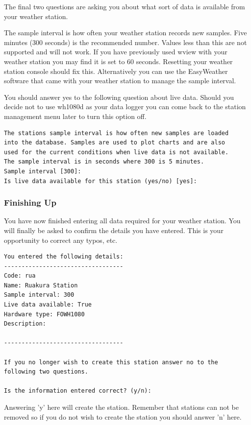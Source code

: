 \documentclass[a4paper,10pt,draft]{book}
\begin{document}
The final two questions are asking you about what sort of data is available from your weather station.

The sample interval is how often your weather station records new samples. Five minutes (300 seconds) is the recommended number. Values less than this are not supported and will not work. If you have previously used wview with your weather station you may find it is set to 60 seconds. Resetting your weather station console should fix this. Alternatively you can use the EasyWeather software that came with your weather station to manage the sample interval.

You should answer yes to the following question about live data. Should you decide not to use wh1080d as your data logger you can come back to the station management menu later to turn this option off.

\begin{verbatim}
The stations sample interval is how often new samples are loaded 
into the database. Samples are used to plot charts and are also 
used for the current conditions when live data is not available. 
The sample interval is in seconds where 300 is 5 minutes.
Sample interval [300]:
Is live data available for this station (yes/no) [yes]:
\end{verbatim}

\subsubsection{Finishing Up}
You have now finished entering all data required for your weather station. You will finally be asked to confirm the details you have entered. This is your opportunity to correct any typos, etc.

\begin{verbatim}
You entered the following details:
----------------------------------
Code: rua
Name: Ruakura Station
Sample interval: 300
Live data available: True
Hardware type: FOWH1080
Description:

----------------------------------

If you no longer wish to create this station answer no to the 
following two questions.

Is the information entered correct? (y/n):
\end{verbatim}

Answering 'y' here will create the station. Remember that stations can not be removed so if you do not wish to create the station you should answer 'n' here.
\end{document}
